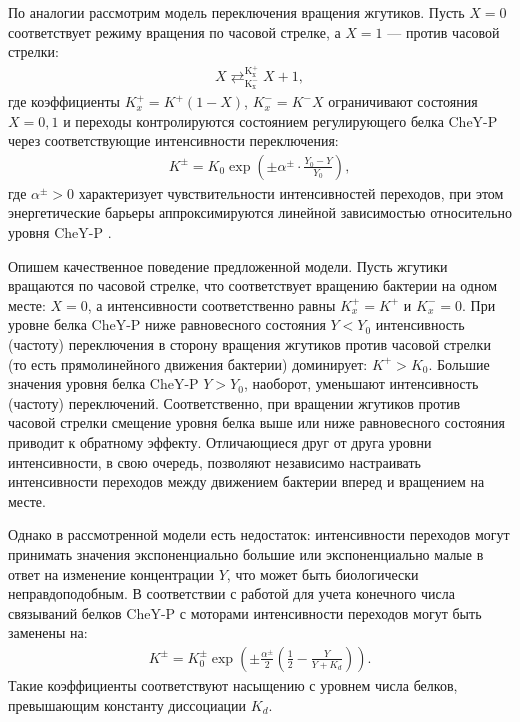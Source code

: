По аналогии рассмотрим модель переключения вращения жгутиков. Пусть $X = 0$ соответствует режиму вращения по часовой стрелке, а $X = 1$ — против часовой стрелки:
\begin{equation}
    \begin{aligned}
        X \mathrel{\mathop{\rightleftarrows}^{\mathrm{K_{x}^{+}}}_{\mathrm{K_{x}^{-}}}} X + 1,
    \label{eq:turning}
    \end{aligned}
\end{equation}
где коэффициенты $K_x^{+}=K^{+}(1-X)$, $K_x^{-}=K^{-}X$ ограничивают состояния $X={0, 1}$ и переходы контролируются состоянием регулирующего белка CheY-P через соответствующие интенсивности переключения:
\begin{equation}
    \begin{aligned}
        K^{\pm}=K_0 \exp \left (\pm\alpha^\pm \cdot \frac{Y_0-Y}{Y_0} \right ),
    \label{eq:turning-rates}
    \end{aligned}
\end{equation}
где $\alpha^\pm>0$ характеризует чувствительности интенсивностей переходов, при этом энергетические барьеры аппроксимируются линейной зависимостью относительно уровня CheY-P \cite{khan_steady-state_1980}.

Опишем качественное поведение предложенной модели. Пусть жгутики вращаются по часовой стрелке, что соответствует вращению бактерии на одном месте: $X=0$, а интенсивности соответственно равны $K_x^{+}=K^{+}$ и $K_x^{-}=0$. При уровне белка CheY-P ниже равновесного состояния $Y<Y_0$ интенсивность (частоту) переключения в сторону вращения жгутиков против часовой стрелки (то есть прямолинейного движения бактерии) доминирует: $K^{+}>K_0$. Большие значения уровня белка CheY-P $Y>Y_0$, наоборот, уменьшают интенсивность (частоту) переключений. Соответственно, при вращении жгутиков против часовой стрелки смещение уровня белка выше или ниже равновесного состояния приводит к обратному эффекту. Отличающиеся друг от друга уровни интенсивности, в свою очередь, позволяют независимо настраивать интенсивности переходов между движением бактерии вперед и вращением на месте.

Однако в рассмотренной модели есть недостаток: интенсивности переходов могут принимать значения экспоненциально большие или экспоненциально малые в ответ на изменение концентрации $Y$, что может быть биологически неправдоподобным. В соответствии с работой \cite{frankel_adaptability_2014} для учета конечного числа связываний белков CheY-P с моторами интенсивности переходов могут быть заменены на:
\begin{equation}
    \begin{aligned}
        K^{\pm}=K_0^{\pm} \exp \left (\pm\frac{\alpha^\pm}{2} \left (\frac{1}{2} - \frac{Y}{Y+K_d} \right ) \right ).
    \label{eq:turning-rates-kd}
    \end{aligned}
\end{equation}
Такие коэффициенты соответствуют насыщению с уровнем числа белков, превышающим константу диссоциации $K_d$.

